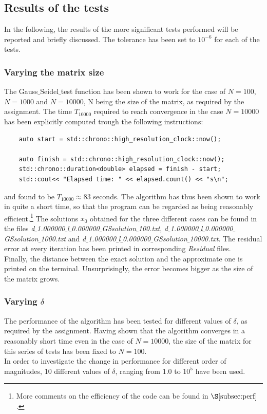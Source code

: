 \documentclass{article}
\theoremstyle{theorem}
\theoremstyle{definition}
\begin{document}
\subsection{Results of the tests}
In the following, the results of the more significant tests performed will be reported and briefly discussed. The tolerance has been set to $10^{-6}$ for each of the tests.

\subsubsection{Varying the matrix size}
The Gauss$\_$Seidel$\_$test function has been shown to work for the case of $N=100$, $N=1000$ and $N=10000$, N being the size of the matrix, as required by the assignment.
The time $T_{10000}$ required to reach convergence in the case $N=10000$ has been explicitly computed trough the following instructions:

\begin{verbatim}
	auto start = std::chrono::high_resolution_clock::now();
	
	auto finish = std::chrono::high_resolution_clock::now();
	std::chrono::duration<double> elapsed = finish - start;
	std::cout<< "Elapsed time: " << elapsed.count() << "s\n";
\end{verbatim} 

and found to be $T_{10000}\approx 83$ seconds. The algorithm has thus been shown to work in quite a short time, so that the program can be regarded as being reasonably efficient.\footnote{More comments on the efficiency of the code can be found in $\S\ref{subsec:perf}$.} The solutions $x_0$ obtained for the three different cases can be found in the files \emph{d$\_$1.000000$\_$l$\_$0.000000$\_$GSsolution$\_$100.txt}, \emph{d$\_$1.000000$\_$l$\_$0.000000$\_$GSsolution$\_$1000.txt} and \emph{d$\_$1.000000$\_$l$\_$0.000000$\_$GSsolution$\_$10000.txt}. The residual error at every iteration has been printed in corresponding \emph{Residual} files.\\
Finally, the distance between the exact solution and the approximate one is printed on the terminal. Unsurprisingly, the error becomes bigger as the size of the matrix grows.\\

\subsubsection{Varying $\delta$}
The performance of the algorithm has been tested for different values of $\delta$, as required by the assignment. Having shown that the algorithm converges in a reasonably short time even in the case of $N=10000$, the size of the matrix for this series of tests has been fixed to $N=100$.\\
In order to investigate the change in performance for different order of magnitudes, 10 different values of $\delta$, ranging from $1.0$ to $10^5$ have been used.
\end{document}
